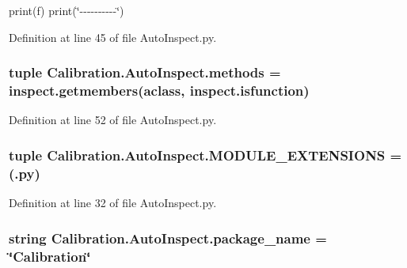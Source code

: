 print(f) print(\char`\"{}-\/-\/-\/-\/-\/-\/-\/-\/-\/-\/\char`\"{}) 



Definition at line 45 of file Auto\+Inspect.\+py.

\hypertarget{namespace_calibration_1_1_auto_inspect_af9c9d86c501c1b59576a64b1576b4a33}{}
\subsubsection[{methods}]{\setlength{\rightskip}{0pt plus 5cm}tuple Calibration.\+Auto\+Inspect.\+methods = inspect.\+getmembers({\bf aclass}, inspect.\+isfunction)}\label{namespace_calibration_1_1_auto_inspect_af9c9d86c501c1b59576a64b1576b4a33}


Definition at line 52 of file Auto\+Inspect.\+py.

\hypertarget{namespace_calibration_1_1_auto_inspect_ad2c387d0241a2d154858091e8c0f40d3}{}
\subsubsection[{M\+O\+D\+U\+L\+E\+\_\+\+E\+X\+T\+E\+N\+S\+I\+O\+N\+S}]{\setlength{\rightskip}{0pt plus 5cm}tuple Calibration.\+Auto\+Inspect.\+M\+O\+D\+U\+L\+E\+\_\+\+E\+X\+T\+E\+N\+S\+I\+O\+N\+S = (\textquotesingle{}.py\textquotesingle{})}\label{namespace_calibration_1_1_auto_inspect_ad2c387d0241a2d154858091e8c0f40d3}


Definition at line 32 of file Auto\+Inspect.\+py.

\hypertarget{namespace_calibration_1_1_auto_inspect_a60adc5b4a66d31841cef737720b2825a}{}
\subsubsection[{package\+\_\+name}]{\setlength{\rightskip}{0pt plus 5cm}string Calibration.\+Auto\+Inspect.\+package\+\_\+name = \char`\"{}Calibration\char`\"{}}\label{namespace_calibration_1_1_auto_inspect_a60adc5b4a66d31841cef737720b2825a}


